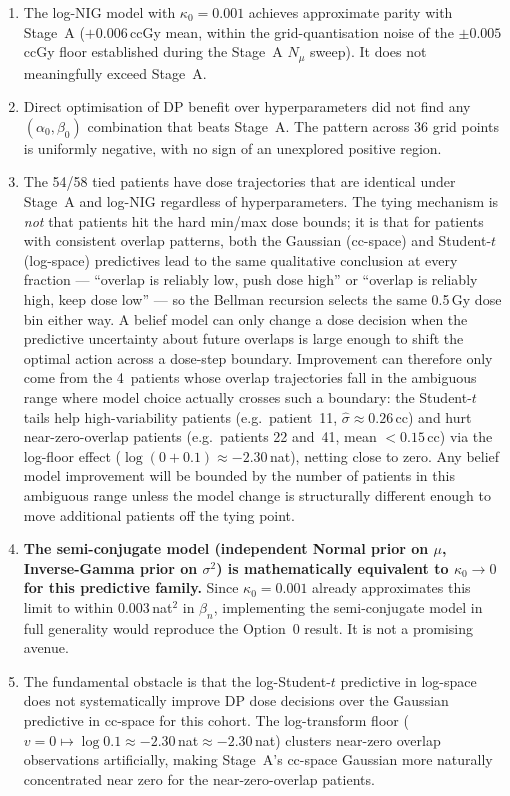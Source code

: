 \documentclass[11pt]{article}
\begin{document}
\begin{enumerate}
\item The log-NIG model with $\kappa_0 = 0.001$ achieves approximate parity with
Stage~A ($+0.006$\,ccGy mean, within the grid-quantisation noise of the
$\pm0.005$\,ccGy floor established during the Stage~A $N_\mu$ sweep).  It does not
meaningfully exceed Stage~A.

\item Direct optimisation of DP benefit over hyperparameters did not find any
$(\alpha_0, \beta_0)$ combination that beats Stage~A.  The pattern across 36 grid
points is uniformly negative, with no sign of an unexplored positive region.

\item The 54/58 tied patients have dose trajectories that are identical under
Stage~A and log-NIG regardless of hyperparameters.  The tying mechanism is
\emph{not} that patients hit the hard min/max dose bounds; it is that for patients
with consistent overlap patterns, both the Gaussian (cc-space) and Student-$t$
(log-space) predictives lead to the same qualitative conclusion at every fraction ---
``overlap is reliably low, push dose high'' or ``overlap is reliably high, keep
dose low'' --- so the Bellman recursion selects the same 0.5\,Gy dose bin either
way.  A belief model can only change a dose decision when the predictive uncertainty
about future overlaps is large enough to shift the optimal action across a dose-step
boundary.  Improvement can therefore only come from the 4~patients whose overlap
trajectories fall in the ambiguous range where model choice actually crosses such a
boundary: the Student-$t$ tails help high-variability patients (e.g.\ patient~11,
$\hat\sigma \approx 0.26$\,cc) and hurt near-zero-overlap patients (e.g.\ patients
22 and~41, mean $< 0.15$\,cc) via the log-floor effect
($\log(0 + 0.1) \approx -2.30$\,nat), netting close to zero.  Any belief model
improvement will be bounded by the number of patients in this ambiguous range unless
the model change is structurally different enough to move additional patients off the
tying point.

\item \textbf{The semi-conjugate model (independent Normal prior on $\mu$,
Inverse-Gamma prior on $\sigma^2$) is mathematically equivalent to $\kappa_0 \to
0$ for this predictive family.}  Since $\kappa_0 = 0.001$ already approximates this
limit to within $0.003$\,nat$^2$ in $\beta_n$, implementing the semi-conjugate
model in full generality would reproduce the Option~0 result.  It is not a
promising avenue.

\item The fundamental obstacle is that the log-Student-$t$ predictive in
log-space does not systematically improve DP dose decisions over the Gaussian
predictive in cc-space for this cohort.  The log-transform floor
($v = 0 \mapsto \log 0.1 \approx -2.30$\,nat$\approx -2.30$\,nat) clusters near-zero
overlap observations artificially, making Stage~A's cc-space Gaussian more
naturally concentrated near zero for the near-zero-overlap patients.
\end{enumerate}
\end{document}
